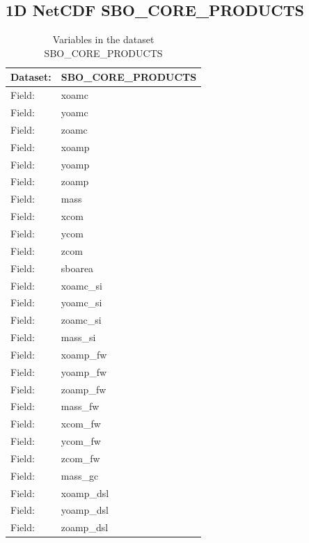 \subsection{1D NetCDF SBO\_CORE\_PRODUCTS}
\newp
\begin{longtable}{|p{}|p{}|}
\caption{Variables in the dataset SBO\_CORE\_PRODUCTS}
\label{tab:table-SBO_CORE_PRODUCTS-fields} \\ 
\hline \endhead \hline \endfoot
\rowcolor{lightgray} \textbf{Dataset:} & \textbf{SBO\_CORE\_PRODUCTS} \\ \hline
Field: &xoamc \\ \hline
Field: &yoamc \\ \hline
Field: &zoamc \\ \hline
Field: &xoamp \\ \hline
Field: &yoamp \\ \hline
Field: &zoamp \\ \hline
Field: &mass \\ \hline
Field: &xcom \\ \hline
Field: &ycom \\ \hline
Field: &zcom \\ \hline
Field: &sboarea \\ \hline
Field: &xoamc\_si \\ \hline
Field: &yoamc\_si \\ \hline
Field: &zoamc\_si \\ \hline
Field: &mass\_si \\ \hline
Field: &xoamp\_fw \\ \hline
Field: &yoamp\_fw \\ \hline
Field: &zoamp\_fw \\ \hline
Field: &mass\_fw \\ \hline
Field: &xcom\_fw \\ \hline
Field: &ycom\_fw \\ \hline
Field: &zcom\_fw \\ \hline
Field: &mass\_gc \\ \hline
Field: &xoamp\_dsl \\ \hline
Field: &yoamp\_dsl \\ \hline
Field: &zoamp\_dsl \\ \hline
\end{longtable}

\pagebreak

